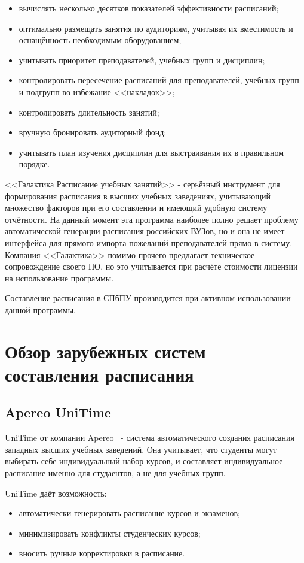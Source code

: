 \begin{itemize}
	\item вычислять несколько десятков показателей эффективности расписаний;
	\item оптимально размещать занятия по аудиториям, учитывая их вместимость и оснащённость необходимым оборудованием;
	\item учитывать приоритет преподавателей, учебных групп и дисциплин;
	\item контролировать пересечение расписаний для преподавателей, учебных групп и подгрупп во избежание <<накладок>>;
	\item контролировать длительность занятий;
	\item вручную бронировать аудиторный фонд;
	\item учитывать план изучения дисциплин для выстраивания их в правильном порядке.
\end{itemize}

<<Галактика Расписание учебных занятий>> - серьёзный инструмент для формирования расписания в высших учебных заведениях, учитывающий множество факторов при его составлении и имеющий удобную систему отчётности. На данный момент эта программа наиболее полно решает проблему автоматической генерации расписания российских ВУЗов, но и она не имеет интерфейса для прямого импорта пожеланий преподавателей прямо в систему. Компания <<Галактика>> помимо прочего предлагает техническое сопровождение своего ПО, но это учитывается при расчёте стоимости лицензии на использование программы.

Составление расписания в СПбПУ производится при активном использовании данной программы.

\section{Обзор зарубежных систем составления расписания} \label{ch1:sec3}	

\subsection {Apereo UniTime}
UniTime от компании Apereo~\cite{unitime} - система автоматического создания расписания западных высших учебных заведений. Она учитывает, что студенты могут выбирать себе индивидуальный набор курсов, и составляет индивидуальное расписание именно для студаентов, а не для учебных групп. 

UniTime даёт возможность:
\begin{itemize}
	\item автоматически генерировать расписание курсов и экзаменов;
	\item минимизировать конфликты студенческих курсов;
	\item вносить ручные корректировки в расписание.
\end{itemize}

